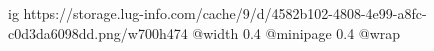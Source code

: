  
 
 
 
 

\ifcmt
  ig https://storage.lug-info.com/cache/9/d/4582b102-4808-4e99-a8fc-c0d3da6098dd.png/w700h474%
  @width 0.4
  @minipage 0.4
  @wrap \parpic[r]
\fi
